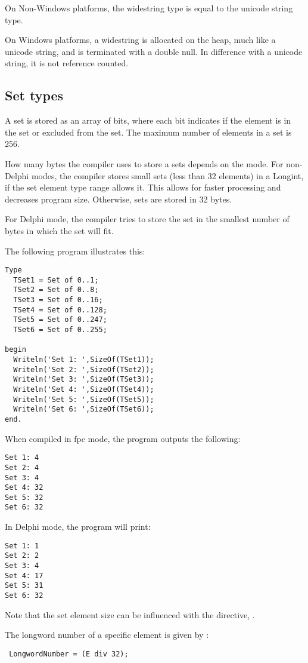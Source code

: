 On Non-Windows platforms, the widestring type is equal to the unicode string type.

On Windows platforms, a widestring is allocated on the heap, much like a unicode
string, and is terminated with a double null. In difference with a unicode
string, it is not reference counted.

\subsection{Set types}
A set is stored as an array of bits, where each bit indicates
if the element is in the set or excluded from the set. 
The maximum number of elements in a set is 256.

How many bytes the compiler uses to store a sets depends on the mode.
For non-Delphi modes, the compiler stores small sets (less than 32 elements) in a Longint, 
if the set element type range allows it. This allows for faster processing and decreases
program size. Otherwise, sets are stored in 32 bytes.

For Delphi mode, the compiler tries to store the set in the smallest number
of bytes in which the set will fit. 

The following program illustrates this:
\begin{verbatim} 
Type
  TSet1 = Set of 0..1;
  TSet2 = Set of 0..8;
  TSet3 = Set of 0..16;
  TSet4 = Set of 0..128;
  TSet5 = Set of 0..247;
  TSet6 = Set of 0..255;

begin
  Writeln('Set 1: ',SizeOf(TSet1));
  Writeln('Set 2: ',SizeOf(TSet2));
  Writeln('Set 3: ',SizeOf(TSet3));
  Writeln('Set 4: ',SizeOf(TSet4));
  Writeln('Set 5: ',SizeOf(TSet5));
  Writeln('Set 6: ',SizeOf(TSet6));
end.
\end{verbatim}
When compiled in fpc mode, the program outputs the following:
\begin{verbatim}
Set 1: 4
Set 2: 4
Set 3: 4
Set 4: 32
Set 5: 32
Set 6: 32
\end{verbatim}
In Delphi mode, the program will print:
\begin{verbatim}
Set 1: 1
Set 2: 2
Set 3: 4
Set 4: 17
Set 5: 31
Set 6: 32
\end{verbatim}

Note that the set element size can be influenced with the 
directive, .

The longword number of a specific element  is given by :
\begin{verbatim}
 LongwordNumber = (E div 32);
\end{verbatim}

